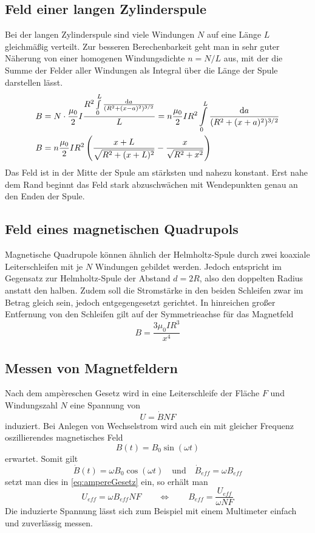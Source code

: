 \subsection{Feld einer langen Zylinderspule}
Bei der langen Zylinderspule sind viele Windungen $ N $ auf eine Länge $ L $ gleichmäßig verteilt. Zur besseren Berechenbarkeit geht man in sehr guter Näherung von einer homogenen Windungsdichte $ n = N/L $ aus, mit der die Summe der Felder aller Windungen als Integral über die Länge der Spule darstellen lässt.
\begin{align}
	B &= N\cdot\frac{\mu_0}{2} I \frac{R^2\int\limits_{0}^{L} \frac{\mathrm{d} a}{(R^2 + (x-a)^2)^{3/2}}}{L} = n \frac{\mu_0}{2} I R^2 \int\limits_{0}^{L} \frac{\mathrm{d} a}{(R^2 + (x+a)^2)^{3/2}} \notag \\
	B &= n \frac{\mu_0}{2} IR^2 \left(\frac{x + L}{\sqrt{R^2 + (x + L)^2}} - \frac{x}{\sqrt{R^2 + x^2}}\right)
\end{align}
Das Feld ist in der Mitte der Spule am stärksten und nahezu konstant. Erst nahe dem Rand beginnt das Feld stark abzuschwächen mit Wendepunkten genau an den Enden der Spule.

\subsection{Feld eines magnetischen Quadrupols}
Magnetische Quadrupole können ähnlich der Helmholtz-Spule durch zwei koaxiale Leiterschleifen mit je $ N $ Windungen gebildet werden. Jedoch entspricht im Gegensatz zur Helmholtz-Spule der Abstand $ d = 2R $, also den doppelten Radius anstatt den halben. Zudem soll die Stromstärke in den beiden Schleifen zwar im Betrag gleich sein, jedoch entgegengesetzt gerichtet. In hinreichen großer Entfernung von den Schleifen gilt auf der Symmetrieachse für das Magnetfeld
\begin{equation}
	B = \frac{3\mu_0IR^3}{x^4}
\end{equation}
\subsection{Messen von Magnetfeldern}
Nach dem ampèreschen Gesetz wird in eine Leiterschleife der Fläche $ F $ und Windungszahl $ N $ eine Spannung von 
\begin{equation}
	U = \dot{B} NF \label{eq:ampereGesetz}
\end{equation}
induziert. Bei Anlegen von Wechselstrom wird auch ein mit gleicher Frequenz oszillierendes magnetisches Feld \begin{equation}
	B(t) = B_0 \sin(\omega t)
\end{equation}
erwartet. Somit gilt
\begin{equation}
	\dot B(t) = \omega B_0 \cos(\omega t) \quad \text{und} \quad \dot B_{eff} = \omega B_{eff}
\end{equation}
setzt man dies in \eqref{eq:ampereGesetz} ein, so erhält man 
\begin{equation}
  U_{eff} = \omega B_{eff} NF \qquad \Leftrightarrow \qquad B_{eff} = \frac{U_{eff}}{\omega NF}
\end{equation}
Die induzierte Spannung lässt sich zum Beispiel mit einem Multimeter einfach und zuverlässig messen.
\newpage
